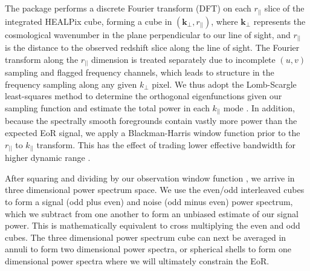 \documentclass[iop]{emulateapj}
\begin{document}
The \eppsilon package performs a discrete Fourier transform (DFT) on each $r_{||}$ slice of 
the integrated HEALPix cube, forming a cube in $(\mathbf{k}_{\perp},r_{||})$, where $
\mathbf{k}_{\perp}$ represents the cosmological wavenumber in the plane perpendicular to 
our line of sight, and $r_{||}$ is the distance to the observed redshift slice along the line of 
sight. The Fourier transform along the $r_{||}$ dimension is treated separately due to 
incomplete $(u,v)$ sampling and flagged frequency channels, which leads to structure in the 
frequency sampling along any given $k_{\perp}$ pixel. We thus adopt the Lomb-Scargle 
least-squares method to determine the orthogonal eigenfunctions given our sampling 
function and estimate the total power in each $k_{||}$ mode \citep{Scargle:1982}. In 
addition, because the spectrally smooth foregrounds contain vastly more power than the 
expected EoR signal, we apply a Blackman-Harris window function prior to the $r_{||}$ to 
$k_{||}$ transform. This has the effect of trading lower effective bandwidth for higher 
dynamic range \citep[e.g.][]{Thyagarajan:2016, Thyagarajan:2013}.

After squaring and dividing by our observation window function \citep{Bowman:2006}, we 
arrive in three dimensional power spectrum space. We use the even/odd interleaved cubes 
to form a signal (odd plus even) and noise (odd minus even) power spectrum, which we 
subtract from one another to form an unbiased estimate of our signal power. This is 
mathematically equivalent to cross multiplying the even and odd cubes. The three 
dimensional power spectrum cube can next be averaged in annuli to form two dimensional 
power spectra, or spherical shells to form one dimensional power spectra where we will 
ultimately constrain the EoR.
\end{document}
